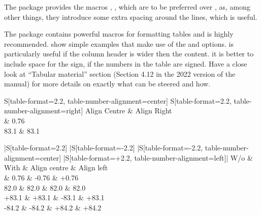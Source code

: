 \documentclass[REPORT=false, UKenglish]{atlasdoc}
\begin{document}
The  package provides the macros
, ,  which are to be preferred over ,
as, among other things, they introduce some extra spacing around the lines, which is useful.

The  package contains powerful macros for formatting tables
and is highly recommended.
 show simple examples that make use of the
 and  options.
 is particularly useful if the column header is wider then the content.
it is better to include space for the sign, if the numbers in the table are signed.
Have a close look at \enquote{Tabular material} section
(Section 4.12 in the 2022 version of the  manual)
for more details on exactly what can be steered and how.

\begin{table}[htbp]
\begin{tcblisting}{}
  \caption{Simple table using  column.}
  \label{tab:example0a}
  \centering
  \begin{tabular}{
    S[table-format=2.2, table-number-alignment=center]
    S[table-format=2.2, table-number-alignment=right]
  }
    \toprule
    {Align Centre} & {Align Right} \\
     & 0.76 \\
    83.1 & 83.1 \\
    \bottomrule
  \end{tabular}
\end{tcblisting}
\end{table}

\begin{table}[htbp]
\begin{tcblisting}{}
  \caption{Simple table for numbers with signs using  column.
    Vertical lines are included to show alignment (problems) --
    see the first column.}
  \label{tab:example0b}
  \centering
  \begin{tabular}{
    |S[table-format=2.2]
    |S[table-format=-2.2]
    |S[table-format=-2.2, table-number-alignment=center]
    |S[table-format=+2.2, table-number-alignment=left]|
  }
    \toprule
    {W/o} & {With} & {Align centre} & {Align left} \\
      & 0.76  & -0.76 & +0.76 \\
    82.0  & 82.0  &  82.0 &  82.0 \\
    +83.1 & +83.1 & -83.1 & +83.1 \\
    -84.2 & -84.2 & +84.2 & +84.2 \\
    \bottomrule
  \end{tabular}
\end{tcblisting}
\end{table}
\end{document}
